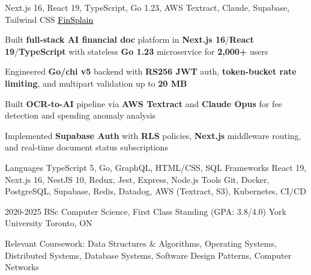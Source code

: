 \documentclass[11pt, a4paper]{awesome-cv}
\begin{document}
\begin{cventries}
\end{cventries}


\begin{cventries}

  \cventry
  {Next.js 16, React 19, TypeScript, Go 1.23, AWS Textract, Claude, Supabase, Tailwind CSS}
  {\href{https://finsplain.net}{\textcolor{black}{\underline{FinSplain}} \faExternalLink}}
  {}
  {}
  {
    \begin{cvitems}
      \item {Built \textbf{full-stack AI financial doc} platform in \textbf{Next.js 16}/\textbf{React 19}/\textbf{TypeScript} with stateless \textbf{Go 1.23} microservice for \textbf{2,000+} users}
      \item {Engineered \textbf{Go/chi v5} backend with \textbf{RS256 JWT} auth, \textbf{token-bucket rate limiting}, and multipart validation up to \textbf{20 MB}}
      \item {Built \textbf{OCR-to-AI} pipeline via \textbf{AWS Textract} and \textbf{Claude Opus} for fee detection and spending anomaly analysis}
      \item {Implemented \textbf{Supabase Auth} with \textbf{RLS} policies, \textbf{Next.js} middleware routing, and real-time document status subscriptions}
    \end{cvitems}
  }

\end{cventries}


\begin{cvskills}
  \cvskill
  {Languages}
  {TypeScript 5, Go, GraphQL, HTML/CSS, SQL}
  \cvskill
  {Frameworks}
  {React 19, Next.js 16, NestJS 10, Redux, Jest, Express, Node.js}
  \cvskill
  {Tools}
  {Git, Docker, PostgreSQL, Supabase, Redis, Datadog, AWS (Textract, S3), Kubernetes, CI/CD}
\end{cvskills}

\vspace{-2mm}

\begin{cventries}
  \cventry
  {2020-2025}
  {BSc Computer Science, First Class Standing (GPA: 3.8/4.0)}
  {York University}
  {Toronto, ON}
  {%
    \begin{cvitems}
      \item {Relevant Coursework: Data Structures \& Algorithms, Operating Systems, Distributed Systems, Database Systems, Software Design Patterns, Computer Networks}
    \end{cvitems}
  }
\end{cventries}

\end{document}
